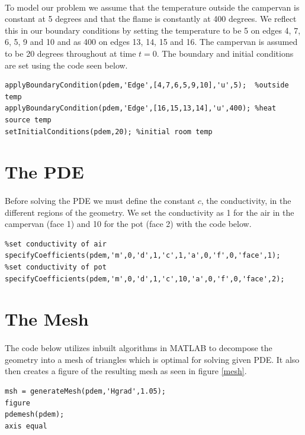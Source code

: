\documentclass[12pt]{article}  %
\begin{document}
\paragraph{} To model our problem we assume that the temperature outside the campervan is constant at 5 degrees and that the flame is constantly at 400 degrees. We reflect this in our boundary conditions by setting the temperature to be 5 on edges 4, 7, 6, 5, 9 and 10 and as 400 on edges 13, 14, 15 and 16. The campervan is assumed to be 20 degrees throughout at time $t=0$. The boundary and initial conditions are set using the code seen below.
\begin{lstlisting}
applyBoundaryCondition(pdem,'Edge',[4,7,6,5,9,10],'u',5);  %outside temp
applyBoundaryCondition(pdem,'Edge',[16,15,13,14],'u',400); %heat source temp
setInitialConditions(pdem,20); %initial room temp
\end{lstlisting}

\section{The PDE}
\paragraph{} Before solving the PDE we must define the constant $c$, the conductivity, in the different regions of the geometry. We set the conductivity as 1 for the air in the campervan (face 1) and 10 for the pot (face 2) with the code below.

\begin{lstlisting}
%set conductivity of air
specifyCoefficients(pdem,'m',0,'d',1,'c',1,'a',0,'f',0,'face',1); 
%set conductivity of pot
specifyCoefficients(pdem,'m',0,'d',1,'c',10,'a',0,'f',0,'face',2); 
\end{lstlisting}

\section{The Mesh}
\paragraph{} The code below utilizes inbuilt algorithms in MATLAB to decompose the geometry into a mesh of triangles which is optimal for solving given PDE. It also then creates a figure of the resulting mesh as seen in figure \ref{mesh}.

\begin{lstlisting}
msh = generateMesh(pdem,'Hgrad',1.05);
figure
pdemesh(pdem);
axis equal 
\end{lstlisting}
\end{document}
